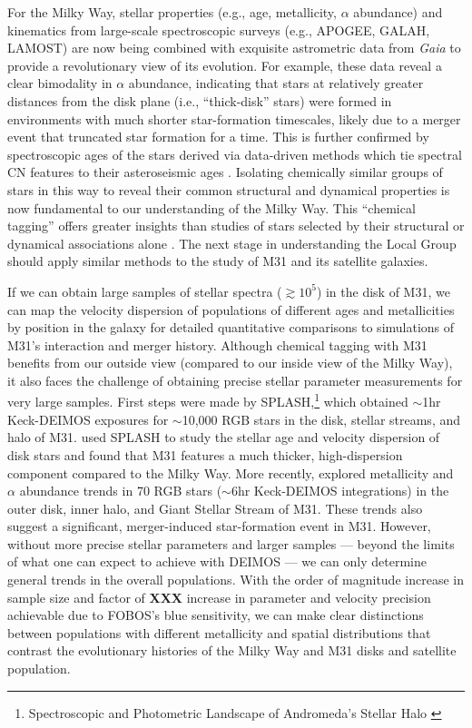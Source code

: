 \documentclass[11pt,a4paper,twoside,onecolumn,openany,final,oldfontcommands]{memoir}
\begin{document}
For the Milky Way, stellar properties (e.g., age, metallicity, $\alpha$ abundance) and kinematics from large-scale spectroscopic surveys (e.g., APOGEE, GALAH, LAMOST) are now being combined with exquisite astrometric data from \textit{Gaia} to provide a revolutionary view of its evolution.  For example, these data reveal a clear bimodality in $\alpha$ abundance, indicating that stars at relatively greater distances from the disk plane (i.e., ``thick-disk'' stars) were formed in environments with much shorter star-formation timescales, likely due to a merger event that truncated star formation for a time. This is further confirmed by spectroscopic ages of the stars derived via data-driven methods which tie spectral CN features to their asteroseismic ages \citep[e.g.][]{Martig16}.  Isolating chemically similar groups of stars in this way to reveal their common structural and dynamical properties is now fundamental to our understanding of the Milky Way.  This ``chemical tagging'' offers greater insights than studies of stars selected by their structural or dynamical associations alone \citep[e.g.,][]{Ting15}.  The next stage in understanding the Local Group should apply similar methods to the study of M31 and its satellite galaxies.

If we can obtain large samples of stellar spectra ($\gtrsim 10^5$) in the disk of M31, we can map the velocity dispersion of populations of different ages and metallicities by position in the galaxy for detailed quantitative comparisons to simulations of M31's interaction and merger history. Although chemical tagging with M31 benefits from our outside view (compared to our inside view of the Milky Way), it also faces the challenge of obtaining precise stellar parameter measurements for very large samples.  First steps were made by SPLASH,\footnote{Spectroscopic and Photometric Landscape of Andromeda’s Stellar Halo \citep[e.g.][]{splash}} which obtained $\sim$1hr Keck-DEIMOS exposures for $\sim$10,000 RGB stars in the disk, stellar streams, and halo of M31.  \citet{dorman15} used SPLASH to study the stellar age and velocity dispersion of disk stars and found that M31 features a much thicker, high-dispersion component compared to the Milky Way.  More recently, \citet{escala20} explored metallicity and $\alpha$ abundance trends in 70 RGB stars ($\sim$6hr Keck-DEIMOS integrations) in the outer disk, inner halo, and Giant Stellar Stream of M31.  These trends also suggest a significant, merger-induced star-formation event in M31.  However, without more precise stellar parameters and larger samples --- beyond the limits of what one can expect to achieve with DEIMOS --- we can only determine general trends in the overall populations.  With the order of magnitude increase in sample size and factor of {\bf XXX} increase in parameter and velocity precision achievable due to FOBOS's blue sensitivity, we can make clear distinctions between populations with different metallicity and spatial distributions that contrast the evolutionary histories of the Milky Way and M31 disks and satellite population.
\end{document}
